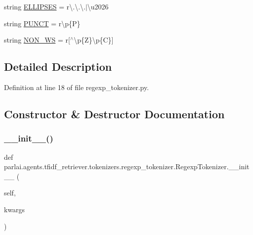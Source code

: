 \begin{DoxyCompactItemize}
\item 
string \hyperlink{classparlai_1_1agents_1_1tfidf__retriever_1_1tokenizers_1_1regexp__tokenizer_1_1RegexpTokenizer_add447e9e9c8fcd85a4e1f32b30f8f314}{E\+L\+L\+I\+P\+S\+ES} = r\textquotesingle{}\textbackslash{}.\textbackslash{}.\textbackslash{}.$\vert$\textbackslash{}u2026\textquotesingle{}
\item 
string \hyperlink{classparlai_1_1agents_1_1tfidf__retriever_1_1tokenizers_1_1regexp__tokenizer_1_1RegexpTokenizer_af837a628caa159704dfb2c565d8d378c}{P\+U\+N\+CT} = r\textquotesingle{}\textbackslash{}p\{P\}\textquotesingle{}
\item 
string \hyperlink{classparlai_1_1agents_1_1tfidf__retriever_1_1tokenizers_1_1regexp__tokenizer_1_1RegexpTokenizer_aba405571ab950ec93b3c92f87ff4aa6a}{N\+O\+N\+\_\+\+WS} = r\textquotesingle{}\mbox{[}$^\wedge$\textbackslash{}p\{Z\}\textbackslash{}p\{C\}\mbox{]}\textquotesingle{}
\end{DoxyCompactItemize}


\subsection{Detailed Description}


Definition at line 18 of file regexp\+\_\+tokenizer.\+py.



\subsection{Constructor \& Destructor Documentation}
\mbox{\label{classparlai_1_1agents_1_1tfidf__retriever_1_1tokenizers_1_1regexp__tokenizer_1_1RegexpTokenizer_af18fd6e3cb635cf6a05f32b90fb51fcc}} 
\subsubsection{\texorpdfstring{\+\_\+\+\_\+init\+\_\+\+\_\+()}{\_\_init\_\_()}}
{\footnotesize\ttfamily def parlai.\+agents.\+tfidf\+\_\+retriever.\+tokenizers.\+regexp\+\_\+tokenizer.\+Regexp\+Tokenizer.\+\_\+\+\_\+init\+\_\+\+\_\+ (\begin{DoxyParamCaption}\item[{}]{self,  }\item[{}]{kwargs }\end{DoxyParamCaption})}

